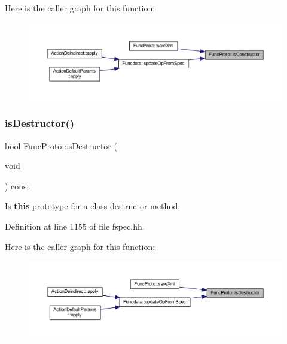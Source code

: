 Here is the caller graph for this function\+:
\nopagebreak
\begin{figure}[H]
\begin{center}
\leavevmode
\includegraphics[width=350pt]{class_func_proto_a007c1b4a9c33831738e3ac9bc283c5a4_icgraph}
\end{center}
\end{figure}
\mbox{\label{class_func_proto_aed492939de15e4ea60f9970f2ec685ac}} 
\subsubsection{\texorpdfstring{isDestructor()}{isDestructor()}}
{\footnotesize\ttfamily bool Func\+Proto\+::is\+Destructor (\begin{DoxyParamCaption}\item[{void}]{ }\end{DoxyParamCaption}) const\hspace{0.3cm}{\ttfamily [inline]}}



Is {\bfseries{this}} prototype for a class destructor method. 



Definition at line 1155 of file fspec.\+hh.

Here is the caller graph for this function\+:
\nopagebreak
\begin{figure}[H]
\begin{center}
\leavevmode
\includegraphics[width=350pt]{class_func_proto_aed492939de15e4ea60f9970f2ec685ac_icgraph}
\end{center}
\end{figure}
\mbox{\label{class_func_proto_a4f4e0521c603ad73b2d73ad96f8cb954}} 
